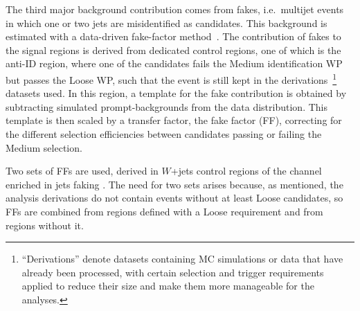The third major background contribution comes from fakes, i.e.\ multijet events in which one or two jets are misidentified as \tauhadvis candidates. 
This background is estimated with a data-driven fake-factor method~\cite{fakes_paper}. 
The contribution of fakes to the signal regions is derived from dedicated control regions, one of which is the anti-ID region, where one of the \tauhad candidates fails the Medium identification WP but passes the Loose WP, such that the event is still kept in the derivations~\footnote{``Derivations'' denote datasets containing MC simulations or data that have already been processed, with certain selection and trigger requirements applied to reduce their size and make them more manageable for the analyses.} datasets used. 
In this region, a template for the fake contribution is obtained by subtracting simulated prompt-\tauhadvis backgrounds from the data distribution. 
This template is then scaled by a transfer factor, the fake factor (FF), correcting for the different selection efficiencies between \tauhadvis candidates passing or failing the Medium selection.

Two sets of FFs are used, derived in $W$+jets control regions of the \taulephad channel enriched in jets faking \tauhadvis.
The need for two sets arises because, as mentioned, the analysis derivations do not contain events without at least Loose \tauhadvis candidates, so FFs are combined from regions defined with a Loose requirement and from regions without it.

